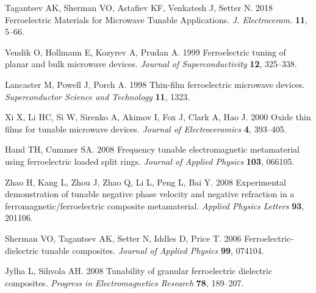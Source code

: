 \documentclass[%
 aip,
 amsmath,amssymb,
 reprint,%
linenumbers
]{revtex4-1}
\begin{document}






\vskip2pc

\begin{thebibliography}{99}

Tagantsev AK, Sherman VO, Astafiev KF, Venkatesh J, Setter N. 2018
  Ferroelectric {Materials} for {Microwave} {Tunable} {Applications}. {\em J.
  Electroceram.} \textbf{11}, 5--66.

Vendik O, Hollmann E, Kozyrev A, Prudan A. 1999  Ferroelectric tuning of planar
  and bulk microwave devices. {\em Journal of Superconductivity} \textbf{12},
  325--338.

Lancaster M, Powell J, Porch A. 1998  Thin-film ferroelectric microwave
  devices. {\em Superconductor Science and Technology} \textbf{11}, 1323.

Xi X, Li HC, Si W, Sirenko A, Akimov I, Fox J, Clark A, Hao J. 2000  Oxide thin
  films for tunable microwave devices. {\em Journal of Electroceramics}
  \textbf{4}, 393--405.

Hand TH, Cummer SA. 2008  Frequency tunable electromagnetic metamaterial using
  ferroelectric loaded split rings. {\em Journal of Applied Physics}
  \textbf{103}, 066105.

Zhao H, Kang L, Zhou J, Zhao Q, Li L, Peng L, Bai Y. 2008  Experimental
  demonstration of tunable negative phase velocity and negative refraction in a
  ferromagnetic/ferroelectric composite metamaterial. {\em Applied Physics
  Letters} \textbf{93}, 201106.

Sherman VO, Tagantsev AK, Setter N, Iddles D, Price T. 2006
  Ferroelectric-dielectric tunable composites. {\em Journal of Applied Physics}
  \textbf{99}, 074104.

Jylha L, Sihvola AH. 2008  Tunability of granular ferroelectric dielectric
  composites. {\em Progress in Electromagnetics Research} \textbf{78},
  189--207.


\end{thebibliography}
\end{document}
